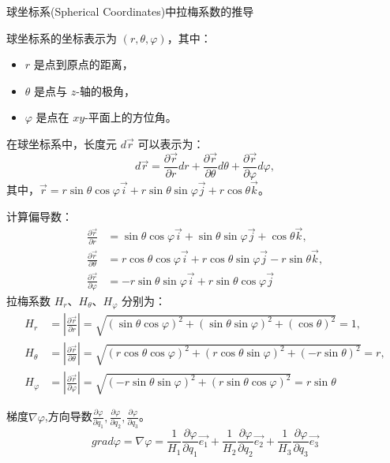 \documentclass[12pt, a4paper, oneside, UTF8]{ctexbook}  %
\newcommand{\pa}{\partial}
\begin{document}
\begin{example}
    球坐标系(Spherical Coordinates)中拉梅系数的推导

    球坐标系的坐标表示为 \((r, \theta, \varphi)\)，其中：
\begin{itemize}
    \item \(r\) 是点到原点的距离，
    \item \(\theta\) 是点与 \(z\)-轴的极角，
    \item \(\varphi\) 是点在 \(xy\)-平面上的方位角。
\end{itemize}

在球坐标系中，长度元 \(d\vec{r}\) 可以表示为：
\[
d\vec{r} = \frac{\partial \vec{r}}{\partial r} dr + \frac{\partial \vec{r}}{\partial \theta} d\theta + \frac{\partial \vec{r}}{\partial \varphi} d\varphi,
\]
其中，\(\vec{r} = r \sin \theta \cos \varphi \vec{i} + r \sin \theta \sin \varphi \vec{j} + r \cos \theta \vec{k}\)。

计算偏导数：
\begin{align*}
    \frac{\partial \vec{r}}{\partial r} &= \sin \theta \cos \varphi \vec{i} + \sin \theta \sin \varphi \vec{j} + \cos \theta \vec{k},
    \\\frac{\partial \vec{r}}{\partial \theta} &= r \cos \theta \cos \varphi \vec{i} + r \cos \theta \sin \varphi \vec{j} -r \sin \theta \vec{k},
    \\\frac{\partial \vec{r}}{\partial \varphi} &= -r \sin \theta \sin \varphi \vec{i} + r \sin \theta \cos \varphi \vec{j}
\end{align*}
拉梅系数 \(H_r\)、\(H_\theta\)、\(H_\varphi\) 分别为：
\begin{align*}
    H_r &= \left| \frac{\partial \vec{r}}{\partial r} \right| = \sqrt{(\sin \theta \cos \varphi)^2 + (\sin \theta \sin \varphi)^2 + (\cos \theta)^2} = 1,
    \\H_\theta &= \left| \frac{\partial \vec{r}}{\partial \theta} \right| = \sqrt{(r \cos \theta \cos \varphi)^2 + (r \cos \theta \sin \varphi)^2 + (-r \sin \theta)^2} = r,
    \\H_\varphi &= \left| \frac{\partial \vec{r}}{\partial \varphi} \right| = \sqrt{(-r \sin \theta \sin \varphi)^2 + (r \sin \theta \cos \varphi)^2} = r \sin \theta
\end{align*}
\end{example}
\begin{defn}
    梯度$\nabla\varphi$,方向导数$\frac{\pa \varphi}{\pa q_1},\frac{\pa \varphi}{\pa q_2},\frac{\pa \varphi}{\pa q_3}$。
    \[
    grad\varphi=\nabla\varphi=\frac{1}{H_1}\frac{\pa \varphi}{\pa q_1}\vec{e_1}+\frac{1}{H_2}\frac{\pa \varphi}{\pa q_2}\vec{e_2}+\frac{1}{H_3}\frac{\pa \varphi}{\pa q_3}\vec{e_3}
    \]
\end{defn}
\end{document}
